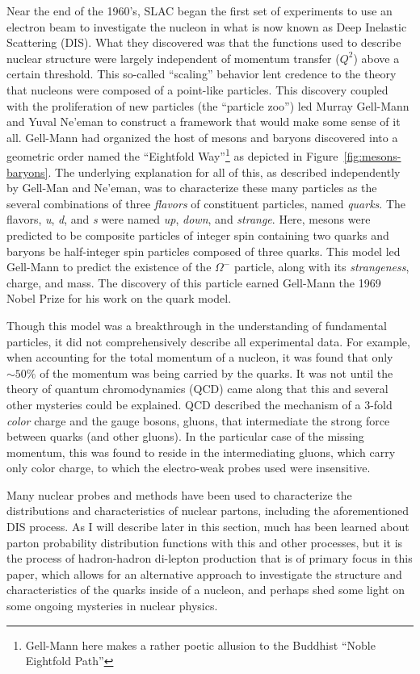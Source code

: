 Near the end of the 1960's, SLAC began the first set of experiments to use an electron beam to investigate the nucleon in what is now known as Deep Inelastic Scattering (DIS). What they discovered was that the functions used to describe nuclear structure were largely independent of momentum transfer ($Q^2$) above a certain threshold. This so-called ``scaling'' behavior lent credence to the theory that nucleons were composed of a point-like particles. This discovery coupled with the proliferation of new particles (the ``particle zoo'') led Murray Gell-Mann and Yuval Ne'eman to construct a framework that would make some sense of it all. Gell-Mann had organized the host of mesons and baryons discovered into a geometric order named the ``Eightfold Way''\footnote{Gell-Mann here makes a rather poetic allusion to the Buddhist ``Noble Eightfold Path''} as depicted in Figure~\ref{fig:mesons-baryons}. The underlying explanation for all of this, as described independently by Gell-Man and Ne'eman, was to characterize these many particles as the several combinations of three \emph{flavors} of constituent particles, named \emph{quarks}. The flavors, \emph{u}, \emph{d}, and \emph{s} were named \emph{up}, \emph{down}, and \emph{strange}. Here, mesons were predicted to be composite particles of integer spin containing two quarks and baryons be half-integer spin particles composed of three quarks. This model led Gell-Mann to predict the existence of the $\Omega^-$ particle, along with its \emph{strangeness}, charge, and mass. The discovery of this particle\cite{1964PhRvL:12204B} earned Gell-Mann the 1969 Nobel Prize for his work on the quark model.

Though this model was a breakthrough in the understanding of fundamental particles, it did not comprehensively describe all experimental data. For example, when accounting for the total momentum of a nucleon, it was found that only $\sim50\%$ of the momentum was being carried by the quarks. It was not until the theory of quantum chromodynamics (QCD) came along that this and several other mysteries could be explained. QCD described the mechanism of a 3-fold \emph{color} charge and the gauge bosons, gluons, that intermediate the strong force between quarks (and other gluons). In the particular case of the missing momentum, this was found to reside in the intermediating gluons\cite{PhysRevLett.43.830}, which carry only color charge, to which the electro-weak probes used were insensitive.

Many nuclear probes and methods have been used to characterize the distributions and characteristics of nuclear partons, including the aforementioned DIS process. As I will describe later in this section, much has been learned about parton probability distribution functions with this and other processes, but it is the process of hadron-hadron di-lepton production that is of primary focus in this paper, which allows for an alternative approach to investigate the structure and characteristics of the quarks inside of a nucleon, and perhaps shed some light on some ongoing mysteries in nuclear physics.

